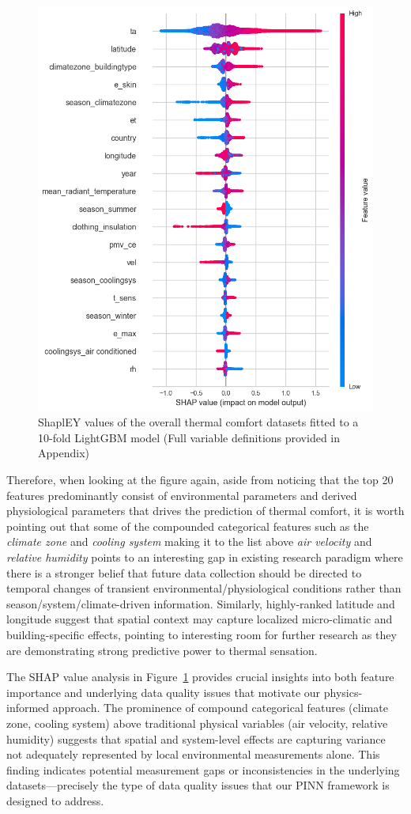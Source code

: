 \begin{figure}[h!]
    \centering
    \includegraphics[width=0.75\linewidth]{figures/shapley_pycaret.png}
    \caption{ShaplEY values of the overall thermal comfort datasets fitted to a 10-fold LightGBM model (Full variable definitions provided in Appendix)}
    \label{fig:lgb-featimp}
\end{figure}

Therefore, when looking at the figure again, aside from noticing that the top 20 features predominantly consist of environmental parameters and derived physiological parameters that drives the prediction of thermal comfort, it is worth pointing out that some of the compounded categorical features such as the \textit{climate zone} and \textit{cooling system} making it to the list above \textit{air velocity} and \textit{relative humidity} points to an interesting gap in existing research paradigm where there is a stronger belief that future data collection should be directed to temporal changes of transient environmental/physiological conditions rather than season/system/climate-driven information. Similarly, highly-ranked latitude and longitude suggest that spatial context may capture localized micro-climatic and building-specific effects, pointing to interesting room for further research as they are demonstrating strong predictive power to thermal sensation.

The SHAP value analysis in Figure~\ref{fig:lgb-featimp} provides crucial insights into both feature importance and underlying data quality issues that motivate our physics-informed approach. The prominence of compound categorical features (climate zone, cooling system) above traditional physical variables (air velocity, relative humidity) suggests that spatial and system-level effects are capturing variance not adequately represented by local environmental measurements alone. This finding indicates potential measurement gaps or inconsistencies in the underlying datasets—precisely the type of data quality issues that our PINN framework is designed to address.

